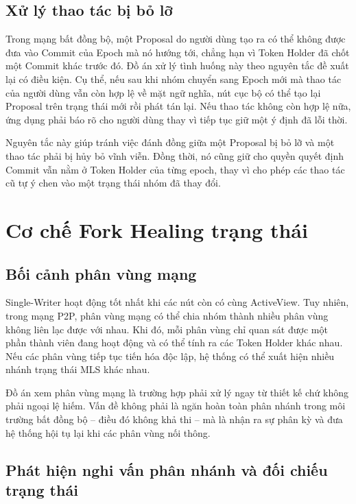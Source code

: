 \documentclass[../DoAn.tex]{subfiles}
\begin{document}
\subsection{Xử lý thao tác bị bỏ lỡ}

Trong mạng bất đồng bộ, một Proposal do người dùng tạo ra có thể không được đưa vào Commit của Epoch mà nó hướng tới, chẳng hạn vì Token Holder đã chốt một Commit khác trước đó. Đồ án xử lý tình huống này theo nguyên tắc đề xuất lại có điều kiện. Cụ thể, nếu sau khi nhóm chuyển sang Epoch mới mà thao tác của người dùng vẫn còn hợp lệ về mặt ngữ nghĩa, nút cục bộ có thể tạo lại Proposal trên trạng thái mới rồi phát tán lại. Nếu thao tác không còn hợp lệ nữa, ứng dụng phải báo rõ cho người dùng thay vì tiếp tục giữ một ý định đã lỗi thời.

Nguyên tắc này giúp tránh việc đánh đồng giữa một Proposal bị bỏ lỡ và một thao tác phải bị hủy bỏ vĩnh viễn. Đồng thời, nó cũng giữ cho quyền quyết định Commit vẫn nằm ở Token Holder của từng epoch, thay vì cho phép các thao tác cũ tự ý chen vào một trạng thái nhóm đã thay đổi.

\section{Cơ chế Fork Healing trạng thái}
\label{sec:fork-healing}

\subsection{Bối cảnh phân vùng mạng}

Single-Writer hoạt động tốt nhất khi các nút còn có cùng ActiveView. Tuy nhiên, trong mạng P2P, phân vùng mạng có thể chia nhóm thành nhiều phân vùng không liên lạc được với nhau. Khi đó, mỗi phân vùng chỉ quan sát được một phần thành viên đang hoạt động và có thể tính ra các Token Holder khác nhau. Nếu các phân vùng tiếp tục tiến hóa độc lập, hệ thống có thể xuất hiện nhiều nhánh trạng thái MLS khác nhau.

Đồ án xem phân vùng mạng là trường hợp phải xử lý ngay từ thiết kế chứ không phải ngoại lệ hiếm. Vấn đề không phải là ngăn hoàn toàn phân nhánh trong môi trường bất đồng bộ -- điều đó không khả thi -- mà là nhận ra sự phân kỳ và đưa hệ thống hội tụ lại khi các phân vùng nối thông.

\subsection{Phát hiện nghi vấn phân nhánh và đối chiếu trạng thái}
\end{document}
